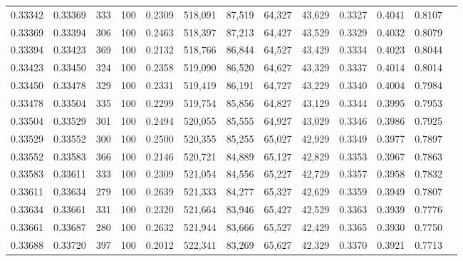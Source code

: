 \begin{tabular}{rrrrrrrrrrrrr}
0.33342 & 0.33369 &   333 & 100 &                                     0.2309 & 518,091 &  87,519 &  64,327 &  43,629 & 0.3327 & 0.4041 & 0.8107 \\
0.33369 & 0.33394 &   306 & 100 &                                     0.2463 & 518,397 &  87,213 &  64,427 &  43,529 & 0.3329 & 0.4032 & 0.8079 \\
0.33394 & 0.33423 &   369 & 100 &                                     0.2132 & 518,766 &  86,844 &  64,527 &  43,429 & 0.3334 & 0.4023 & 0.8044 \\
0.33423 & 0.33450 &   324 & 100 &                                     0.2358 & 519,090 &  86,520 &  64,627 &  43,329 & 0.3337 & 0.4014 & 0.8014 \\
0.33450 & 0.33478 &   329 & 100 &                                     0.2331 & 519,419 &  86,191 &  64,727 &  43,229 & 0.3340 & 0.4004 & 0.7984 \\
0.33478 & 0.33504 &   335 & 100 &                                     0.2299 & 519,754 &  85,856 &  64,827 &  43,129 & 0.3344 & 0.3995 & 0.7953 \\
0.33504 & 0.33529 &   301 & 100 &                                     0.2494 & 520,055 &  85,555 &  64,927 &  43,029 & 0.3346 & 0.3986 & 0.7925 \\
0.33529 & 0.33552 &   300 & 100 &                                     0.2500 & 520,355 &  85,255 &  65,027 &  42,929 & 0.3349 & 0.3977 & 0.7897 \\
0.33552 & 0.33583 &   366 & 100 &                                     0.2146 & 520,721 &  84,889 &  65,127 &  42,829 & 0.3353 & 0.3967 & 0.7863 \\
0.33583 & 0.33611 &   333 & 100 &                                     0.2309 & 521,054 &  84,556 &  65,227 &  42,729 & 0.3357 & 0.3958 & 0.7832 \\
0.33611 & 0.33634 &   279 & 100 &                                     0.2639 & 521,333 &  84,277 &  65,327 &  42,629 & 0.3359 & 0.3949 & 0.7807 \\
0.33634 & 0.33661 &   331 & 100 &                                     0.2320 & 521,664 &  83,946 &  65,427 &  42,529 & 0.3363 & 0.3939 & 0.7776 \\
0.33661 & 0.33687 &   280 & 100 &                                     0.2632 & 521,944 &  83,666 &  65,527 &  42,429 & 0.3365 & 0.3930 & 0.7750 \\
0.33688 & 0.33720 &   397 & 100 &                                     0.2012 & 522,341 &  83,269 &  65,627 &  42,329 & 0.3370 & 0.3921 & 0.7713 \\

\end{tabular}
